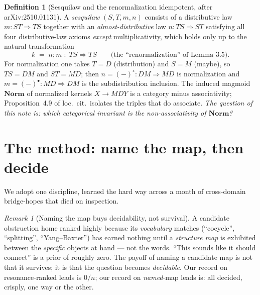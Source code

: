\documentclass[11pt]{amsart}
\theoremstyle{plain}
\theoremstyle{definition}
\newtheorem{definition}[theorem]{Definition}
\theoremstyle{remark}
\newtheorem{remark}[theorem]{Remark}
\newcommand{\Norm}{\mathbf{Norm}}
\newcommand{\comp}{\mathbin{;}}
\begin{document}
\begin{definition}[Sesquilaw and the renormalization idempotent, after arXiv:2510.01131]
\label{def:sesquilaw}
A \emph{sesquilaw} $(S,T,m,n)$ consists of a distributive law $m\colon ST\Rightarrow TS$ together
with an \emph{almost-distributive} law $n\colon TS\Rightarrow ST$ satisfying all four
distributive-law axioms \emph{except} multiplicativity, which holds only up to the natural
transformation
\[
  k \;=\; n\comp m \;\colon\; TS \Rightarrow TS
  \qquad\text{(the ``renormalization'' of Lemma~3.5).}
\]
For normalization one takes $T=D$ (distribution) and $S=M$ (maybe), so $TS=DM$ and $ST=MD$; then
$n=(-)^{\circ}\colon DM\Rightarrow MD$ is normalization and $m=(-)^{\bullet}\colon MD\Rightarrow DM$
is the subdistribution inclusion. The induced magmoid $\Norm$ of normalized kernels $X\to MDY$ is a
category minus associativity; Proposition~4.9 of loc.\ cit.\ isolates the triples that do associate.
\emph{The question of this note is: which categorical invariant is the non-associativity of $\Norm$?}
\end{definition}

\section{The method: name the map, then decide}
\label{sec:method}

We adopt one discipline, learned the hard way across a month of cross-domain bridge-hopes that died
on inspection.

\begin{remark}[Naming the map buys decidability, not survival]
\label{rem:method}
A candidate obstruction home ranked highly because its \emph{vocabulary} matches (``cocycle'',
``splitting'', ``Yang--Baxter'') has earned nothing until a \emph{structure map} is exhibited between
the \emph{specific} objects at hand --- not the words. ``This sounds like it should connect'' is a
prior of roughly zero. The payoff of naming a candidate map is not that it survives; it is that the
question becomes \emph{decidable}. Our record on resonance-ranked leads is $0/n$; our record on
\emph{named}-map leads is: all decided, crisply, one way or the other.
\end{remark}
\end{document}

